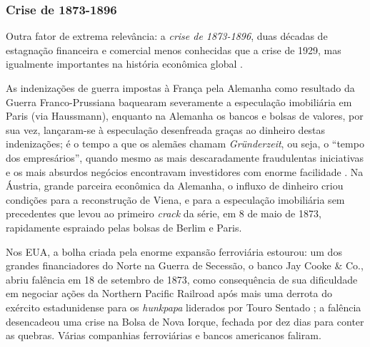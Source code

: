 \subsubsection{Crise de 1873-1896}

Outra fator de extrema relevância: a \textit{crise de 1873-1896}, duas décadas de estagnação financeira e comercial menos conhecidas que a crise de 1929, mas igualmente importantes na história econômica global \cite{Fels1949,Fels1951,hobsbawm_empire_1989,Musson1959,Rezneck1950,Sprague1910,Persons1920}. 

As indenizações de guerra impostas à França pela Alemanha como resultado da Guerra Franco-Prussiana baquearam severamente a especulação imobiliária em Paris (via Haussmann), enquanto na Alemanha os bancos e bolsas de valores, por sua vez, lançaram-se à especulação desenfreada graças ao dinheiro destas indenizações; é o tempo a que os alemães chamam \textit{Gründerzeit}, ou seja, o ``tempo dos empresários'', quando mesmo as mais descaradamente fraudulentas iniciativas e os mais absurdos negócios encontravam investidores com enorme facilidade \cite[p.~61]{hobsbawm_capital_1977}. Na Áustria, grande parceira econômica da Alemanha, o influxo de dinheiro criou condições para a reconstrução de Viena, e para a especulação imobiliária sem precedentes que levou ao primeiro \textit{crack} da série, em 8 de maio de 1873, rapidamente espraiado pelas bolsas de Berlim e Paris.

Nos EUA, a bolha criada pela enorme expansão ferroviária estourou: um dos grandes financiadores do Norte na Guerra de Secessão, o banco Jay Cooke \& Co., abriu falência em 18 de setembro de 1873, como consequência de sua dificuldade em negociar ações da Northern Pacific Railroad após mais uma derrota do exército estadunidense para os \textit{hunkpapa} liderados por Touro Sentado \cite[p.~241-242]{utley_frontier_1973}; a falência desencadeou uma crise na Bolsa de Nova Iorque, fechada por dez dias para conter as quebras. Várias companhias ferroviárias e bancos americanos faliram. 

